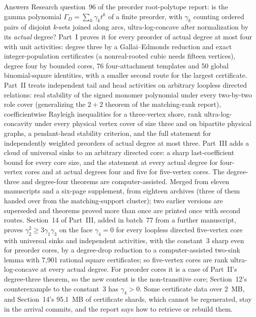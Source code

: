 \documentclass[11pt]{article}
\begin{document}
{Answers Research question~96 of the preorder root-polytope report: is the
gamma polynomial $\Gamma_D=\sum_k\gamma_kt^k$ of a finite preorder, with
$\gamma_k$ counting ordered pairs of disjoint $k$-sets joined along arcs,
ultra-log-concave after normalization by its \emph{actual} degree?  Part~I
proves it for every preorder of actual degree at most four with unit
activities: degree three by a Gallai--Edmonds reduction and exact
integer-population certificates (a nonreal-rooted cubic needs fifteen
vertices), degree four by bounded cores, 76 four-attachment templates and 50
global binomial-square identities, with a smaller second route for the
largest certificate.  Part~II treats independent tail and head activities on
arbitrary loopless directed relations: real stability of the signed monomer
polynomial under every two-by-two role cover (generalizing the $2+2$ theorem
of the matching-rank report), coefficientwise Rayleigh inequalities for a
three-vertex shore, rank ultra-log-concavity under every physical vertex
cover of size three and on bipartite physical graphs, a pendant-head
stability criterion, and the full statement for independently weighted
preorders of actual degree at most three.  Part~III adds a cloud of
universal sinks to an arbitrary directed core: a sharp last-coefficient bound
for every core size, and the statement at every actual degree for four-vertex
cores and at actual degrees four and five for five-vertex cores.  The
degree-three and degree-four theorems are computer-assisted.  Merged from
eleven manuscripts and a six-page supplement, from eighteen archives (three
of them handed over from the matching-support cluster); two earlier
versions are superseded and theorems proved more than once are printed once
with second routes.  Section~14 of Part~III, added in batch~77 from a
further manuscript, proves $\gamma_2^2\ge3\gamma_1\gamma_3$ on the face
$\gamma_4=0$ for every loopless directed five-vertex core with universal
sinks and independent activities, with the constant~3 sharp even for
preorder cores, by a degree-drop reduction to a computer-assisted two-sink
lemma with 7{,}901 rational square certificates; so five-vertex cores are
rank ultra-log-concave at every actual degree.  For preorder cores it is a
case of Part~II's degree-three theorem, so the new content is the
non-transitive core; Section~12's counterexample to the constant~3 has
$\gamma_4>0$.  Some certificate data over 2~MB, and Section~14's 95.1~MB
of certificate shards, which cannot be regenerated, stay in the arrival
commits, and the report says how to retrieve or rebuild them.}
\end{document}
